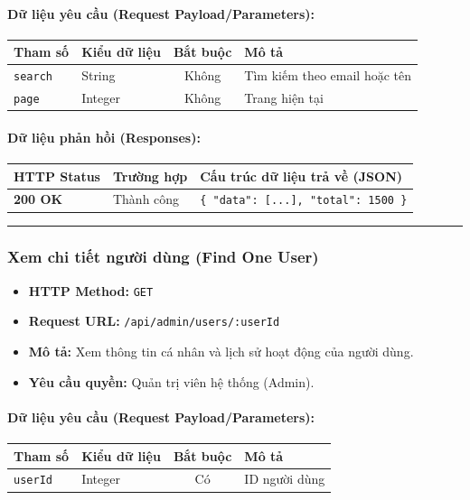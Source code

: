 \documentclass[12pt,a4paper]{article}
\begin{document}
\paragraph{Dữ liệu yêu cầu (Request Payload/Parameters):}
\begin{longtable}{|p{2.8cm}|p{2.2cm}|c|p{7.0cm}|}
\hline
\textbf{Tham số} & \textbf{Kiểu dữ liệu} & \textbf{Bắt buộc} & \textbf{Mô tả} \\ \hline
\endhead
\texttt{search} & String & Không & Tìm kiếm theo email hoặc tên \\ \hline
\texttt{page} & Integer & Không & Trang hiện tại \\ \hline
\end{longtable}

\paragraph{Dữ liệu phản hồi (Responses):}
\begin{longtable}{|p{2.8cm}|p{3.2cm}|p{8.0cm}|}
\hline
\textbf{HTTP Status} & \textbf{Trường hợp} & \textbf{Cấu trúc dữ liệu trả về (JSON)} \\ \hline
\endhead
\textbf{200 OK} & Thành công & \texttt{\{ "data": [...], "total": 1500 \}} \\ \hline
\end{longtable}

\vskip 0.4cm
\noindent\rule{\textwidth}{0.3pt}
\vskip 0.4cm

\subsubsection{Xem chi tiết người dùng (Find One User)}
\begin{itemize}[leftmargin=*]
    \item \textbf{HTTP Method:} \texttt{GET}
    \item \textbf{Request URL:} \texttt{/api/admin/users/:userId}
    \item \textbf{Mô tả:} Xem thông tin cá nhân và lịch sử hoạt động của người dùng.
    \item \textbf{Yêu cầu quyền:} Quản trị viên hệ thống (Admin).
\end{itemize}

\paragraph{Dữ liệu yêu cầu (Request Payload/Parameters):}
\begin{longtable}{|p{2.8cm}|p{2.2cm}|c|p{7.0cm}|}
\hline
\textbf{Tham số} & \textbf{Kiểu dữ liệu} & \textbf{Bắt buộc} & \textbf{Mô tả} \\ \hline
\endhead
\texttt{userId} & Integer & Có & ID người dùng \\ \hline
\end{longtable}
\end{document}
